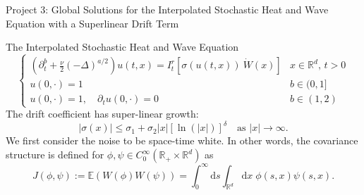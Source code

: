 \documentclass{beamer}%
\numberwithin{equation}{section}
\newcommand{\R}{\mathbb{R}}
\newcommand{\ud}{\ensuremath{\mathrm{d} }}
\begin{document}

	\begin{frame}
		\begin{center}
			Project 3:
			Global Solutions for the Interpolated Stochastic Heat and Wave Equation with a Superlinear Drift Term
		\end{center}
	\end{frame}

	\begin{frame}{The Interpolated Stochastic Heat and Wave Equation}
		\begin{equation}
		\begin{cases}
		\left(\partial^b_t + \frac{\nu}{2}(-\Delta)^{a/2}\right) u(t,x) = I^r_t \left[\sigma(u(t,x))\: \dot W(x) \right] & \text{$x\in \R^d$, $t>0$} \\
		u(0,\cdot) = 1                                                                                                           & b \in (0,1]               \\
		u(0,\cdot) = 1, \quad \partial_t u(0,\cdot) = 0                                                                          & b \in (1,2)
		\end{cases}
		\end{equation}
The drift coefficient has super-linear growth: 
		\[
				|\sigma(x)| \le \sigma_1 + \sigma_2|x|[\ln(|x|)]^{\delta} \quad \text{as } |x| \to \infty.
		\]
We first consider the noise to be space-time white. In other words, the covariance structure is defined for $\phi,\psi \in C_0^\infty(\R_+ \times \R^d) $ as
		\[
		J(\phi, \psi) := \mathbb{E}(W(\phi)W(\psi)) = \int_0^\infty \ud s \int_{\R^d} \ud x \; \phi(s,x)\psi(s,x).
		\]
	\end{frame}
\end{document}
